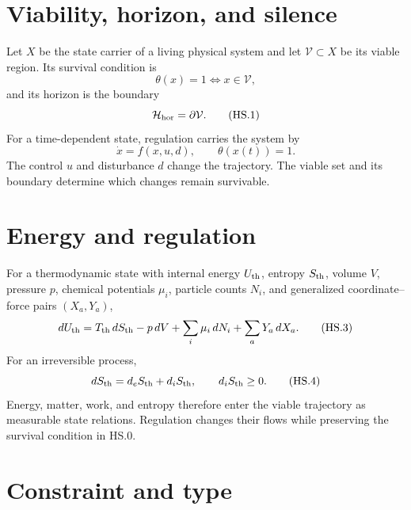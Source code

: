 \documentclass[10pt]{article}
\begin{document}

\begin{abstract}
A horizon is the boundary of a physically viable region. Silence is the zero
residual relation at a completed address. A present occurrence has a carrier,
a constraint, a read, a calibration, and a measured difference. Time orders
occurrences into history; future differences remain individually addressable.
The eight-address field is partitioned into seven matchings. Its triangular
residual condition reconstructs an edge potential exactly. The resulting
equations type survival, boundary, observation, completion, and continuation
inside one physical field.
\end{abstract}

\section{Viability, horizon, and silence}

Let $X$ be the state carrier of a living physical system and let
$\mathcal V\subset X$ be its viable region. Its survival condition is
\[
\theta(x)=1\Longleftrightarrow x\in\mathcal V,
\tag{HS.0}
\]
and its horizon is the boundary
\[
\mathcal H_{\rm hor}=\partial\mathcal V.
\tag{HS.1}
\]
For a time-dependent state, regulation carries the system by
\[
\dot x=f(x,u,d),
\qquad \theta(x(t))=1.
\tag{HS.2}
\]
The control $u$ and disturbance $d$ change the trajectory. The viable set
and its boundary determine which changes remain survivable.

\section{Energy and regulation}

For a thermodynamic state with internal energy $U_{\rm th}$, entropy
$S_{\rm th}$, volume $V$, pressure $p$, chemical potentials $\mu_i$, particle
counts $N_i$, and generalized coordinate--force pairs $(X_a,Y_a)$,
\[
dU_{\rm th}=T_{\rm th}\,dS_{\rm th}-p\,dV
+\sum_i\mu_i\,dN_i+\sum_aY_a\,dX_a.
\tag{HS.3}
\]
For an irreversible process,
\[
dS_{\rm th}=d_eS_{\rm th}+d_iS_{\rm th},
\qquad d_iS_{\rm th}\ge0.
\tag{HS.4}
\]
Energy, matter, work, and entropy therefore enter the viable trajectory as
measurable state relations. Regulation changes their flows while preserving
the survival condition in HS.0.

\section{Constraint and type}
\end{document}
